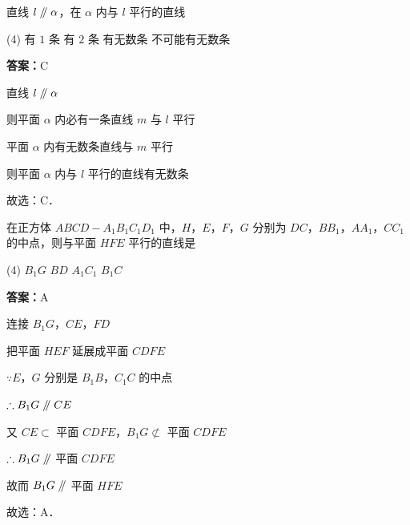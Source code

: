 \vspace{2em}


\begin{example}[\bkstar{1}{5}]
直线 $l\mathrel{/\mkern-5mu/}\alpha$，在 $\alpha$ 内与 $l$ 平行的直线
\begin{tasks}(4)
    \task 有 $1$ 条
    \task 有 $2$ 条
    \task 有无数条
    \task 不可能有无数条
\end{tasks}
\end{example}
\begin{solution}
\textbf{答案：}C

直线 $l\mathrel{/\mkern-5mu/}\alpha$

则平面 $\alpha$ 内必有一条直线 $m$ 与 $l$ 平行

平面 $\alpha$ 内有无数条直线与 $m$ 平行

则平面 $\alpha$ 内与 $l$ 平行的直线有无数条

故选：C．
\end{solution}

\vspace{2em}

\begin{example}[\bkstar{2}{5}]
在正方体 $ABCD-A_1B_1C_1D_1$ 中，$H$，$E$，$F$，$G$ 分别为 $DC$，$BB_1$，$AA_1$，$CC_1$ 的中点，则与平面 $HFE$ 平行的直线是
\begin{tasks}(4)
    \task $B_1G$
    \task $BD$
    \task $A_1C_1$
    \task $B_1C$
\end{tasks}
\end{example}
\begin{solution}
\textbf{答案：}A

连接 $B_1G$，$CE$，$FD$

把平面 $HEF$ 延展成平面 $CDFE$

$\because E$，$G$ 分别是 $B_1B$，$C_1C$ 的中点

$\therefore B_1G\mathrel{/\mkern-5mu/} CE$

又 $CE\subset$ 平面 $CDFE$，$B_1G\not\subset$ 平面 $CDFE$

$\therefore B_1G\mathrel{/\mkern-5mu/}$ 平面 $CDFE$

故而 $B_1G\mathrel{/\mkern-5mu/}$ 平面 $HFE$

故选：A．
\end{solution}

\vspace{2em}

